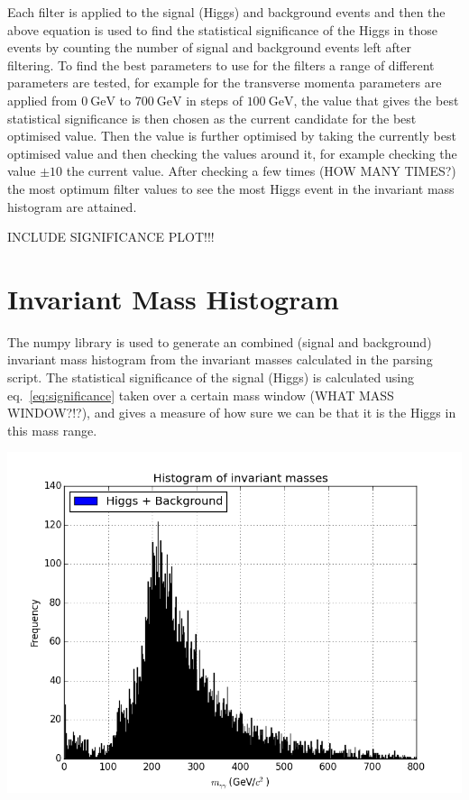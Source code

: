 \documentclass[11pt]{amsart}
\newenvironment{Figure}
  {\par\medskip\noindent\minipage{\linewidth}}
  {\endminipage\par\medskip}
\begin{document}
\begin{multicols}{2}
Each filter is applied to the signal (Higgs) and background events and then the above equation is used to find the statistical significance of the Higgs in those events by counting the number of signal and background events left after filtering. To find the best parameters to use for the filters a range of different parameters are tested, for example for the transverse momenta parameters are applied from $\SI{0}{\giga\electronvolt}$ to $\SI{700}{\giga\electronvolt}$ in steps of $\SI{100}{\giga\electronvolt}$, the value that gives the best statistical significance is then chosen as the current candidate for the best optimised value. Then the value is further optimised by taking the currently best optimised value and then checking the values around it, for example checking the value $\pm 10$ the current value. After checking a few times (HOW MANY TIMES?) the most optimum filter values to see the most Higgs event in the invariant mass histogram are attained.

INCLUDE SIGNIFICANCE PLOT!!!


\section{Invariant Mass Histogram}

The numpy library is used to generate an combined (signal and background) invariant mass histogram from the invariant masses calculated in the parsing script. The statistical significance of the signal (Higgs) is calculated using eq.~\ref{eq:significance} taken over a certain mass window (WHAT MASS WINDOW?!?), and gives a measure of how sure we can be that it is the Higgs in this mass range.

\begin{Figure}
  \centering
  \includegraphics[width=\linewidth]{invmass}
  \label{fig:invmass}
\end{Figure}

\end{multicols}



\end{document}
